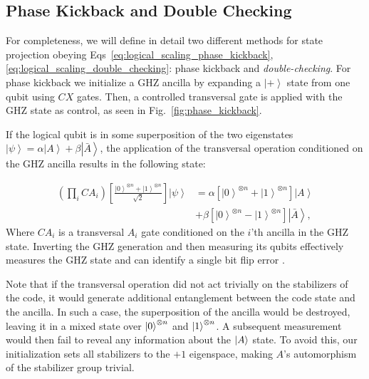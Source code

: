 \documentclass[twocolumn,notitlepage,nofootinbib,floatfix,superscriptaddress]{revtex4-1}
\begin{document}
\subsection{Phase Kickback and Double Checking}
\label{sec:phase-kickback-and-double-checking}

For completeness, we will define in detail two different methods for state projection obeying Eqs~\ref{eq:logical_scaling_phase_kickback},\ref{eq:logical_scaling_double_checking}: phase kickback and \textit{double-checking}. For phase kickback we initialize a GHZ ancilla by expanding a $\left|+\right>$ state from one qubit using $CX$ gates. Then, a controlled transversal gate is applied with the GHZ state as control, as seen in Fig.~\ref{fig:phase_kickback}.

If the logical qubit is in some superposition of the two eigenstates $\left|\psi\right>=\alpha\left|A\right>+\beta\left|\bar{A}\right>$, the application of the transversal operation conditioned on the GHZ ancilla results in the following state:

{\footnotesize
\begin{align}
\left(\prod_i CA_{i}\right)
\left[\frac{\left|0\right>^{\otimes n}+\left|1\right>^{\otimes n}}{\sqrt{2}}\right]\left|\psi\right>&=\alpha\left[\left|0\right>^{\otimes n}+\left|1\right>^{\otimes n}\right]\left|A\right>\nonumber \\ 
&+\beta\left[\left|0\right>^{\otimes n}-\left|1\right>^{\otimes n}\right]\left|\bar{A}\right>,\nonumber
\end{align} }
Where $CA_i$ is a transversal $A_i$ gate conditioned on the $i$'th ancilla in the GHZ state. Inverting the GHZ generation and then measuring its qubits effectively measures the GHZ state and can identify a single bit flip error \cite{chamberland2020very}. 

Note that if the transversal operation did not act trivially on the stabilizers of the code, it would generate additional entanglement between the code state and the ancilla. In such a case, the superposition of the ancilla would be destroyed, leaving it in a mixed state over $\ket{0}^{\otimes n}$ and $\ket{1}^{\otimes n}$. A subsequent measurement would then fail to reveal any information about the $\ket{A}$ state. To avoid this, our initialization sets all stabilizers to the $+1$ eigenspace, making $A$'s automorphism of the stabilizer group trivial. 
\end{document}
